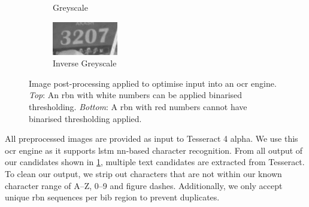 \begin{figure}[h]
\begin{subfigure}[b]{0.23\textwidth}
    \caption{Greyscale}
  \end{subfigure}
  \hspace{\fill}
  \begin{subfigure}[b]{0.23\textwidth}
    \includegraphics[width=\textwidth]{images/processing/ocr/3207_bw_inv}
    \caption{Inverse Greyscale}
  \end{subfigure}
  \hspace{\fill}
  
  \caption[Image post-processing applied to optimise input into an OCR engine]{Image post-processing applied to optimise input into an \gls{ocr} engine. \textit{Top}: An \gls{rbn} with white numbers can be applied binarised thresholding. \textit{Bottom}: A \gls{rbn} with red numbers cannot have binarised thresholding applied.}
  \label{fig:processing_pipeline:ocr_postprocessing}
\end{figure}

All preprocessed images are provided as input to Tesseract 4 alpha. We use this \gls{ocr} engine as it supports \gls{lstm} \gls{nn}-based character recognition. From all output of our candidates shown in \cref{fig:processing_pipeline:ocr_postprocessing}, multiple text candidates are extracted from Tesseract. To clean our output, we strip out characters that are not within our known character range of A--Z, 0--9 and figure dashes. Additionally, we only accept unique \gls{rbn} sequences per bib region to prevent duplicates.